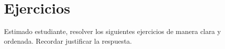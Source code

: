 \section*{\large Ejercicios}

Estimado estudiante, resolver los siguientes ejercicios de manera clara y ordenada. Recordar justificar la respuesta.

